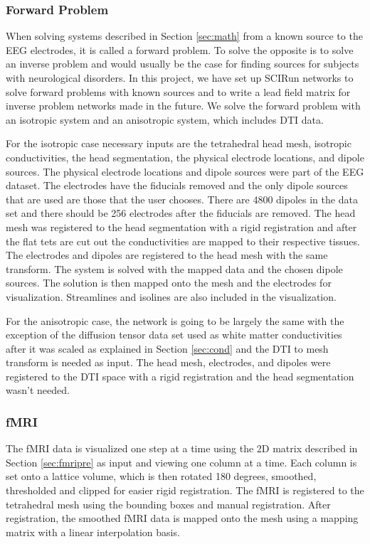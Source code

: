 \subsubsection{Forward Problem}

When solving systems described in Section \ref {sec:math} from a known source to the EEG electrodes, it is called a forward problem. To solve the opposite is to solve an inverse problem and would usually be the case for finding sources for subjects with neurological disorders. In this project, we have set up SCIRun networks to solve forward problems with known sources and to write a lead field matrix for inverse problem networks made in the future. We solve the forward problem with an isotropic system and an anisotropic system, which includes DTI data. 

For the isotropic case necessary inputs are the tetrahedral head mesh, isotropic conductivities, the head segmentation, the physical electrode locations, and dipole sources. The physical electrode locations and dipole sources were part of the EEG dataset. The electrodes have the fiducials removed and the only dipole sources that are used are those that the user chooses. There are 4800 dipoles in the data set and there should be 256 electrodes after the fiducials are removed. The head mesh was registered to the head segmentation with a rigid registration and after the flat tets are cut out the conductivities are mapped to their respective tissues. The electrodes and dipoles are registered to the head mesh with the same transform. The system is solved with the mapped data and the chosen dipole sources. The solution is then mapped onto the mesh and the electrodes for visualization. Streamlines and isolines are also included in the visualization.

For the anisotropic case, the network is going to be largely the same with the exception of the diffusion tensor data set used as white matter conductivities after it was scaled as explained in Section \ref{sec:cond} and the DTI to mesh transform is needed as input. The head mesh, electrodes, and dipoles were registered to the DTI space with a rigid registration and the head segmentation wasn't needed.

\subsubsection{fMRI}

The fMRI data is visualized one step at a time using the 2D matrix described in Section \ref{sec:fmripre} as input and viewing one column at a time. Each column is set onto a lattice volume, which is then rotated 180 degrees, smoothed, thresholded and clipped for easier rigid registration. The fMRI is registered to the tetrahedral mesh using the bounding boxes and manual registration. After registration, the smoothed fMRI data is mapped onto the mesh using a mapping matrix with a linear interpolation basis. 

